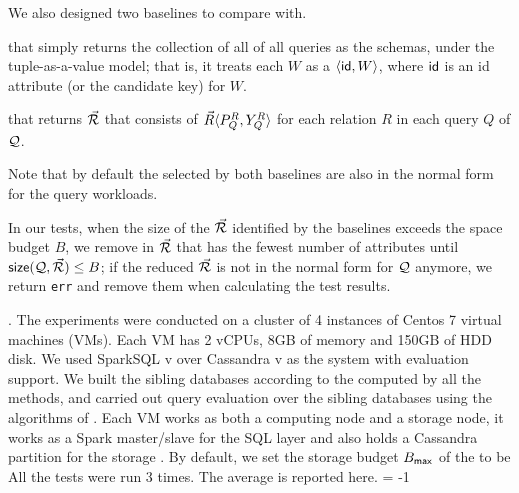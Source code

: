 \vspace{0.7ex}
We also designed two baselines to compare with.

 that simply returns the collection
of all \qcs of all queries as the schemas, under the
tuple-as-a-value model; that is, it treats each \qcs $W$ as a \bs
$\langle \protect\mathsf{id},\allowbreak W\rangle$, where $\protect\mathsf{id}$ is an id attribute (or
the candidate key) for $W$.

 that returns $\vec{{\mathcal R}}$ that consists
of \bss $\vec{R}\langle P_{Q}^{R},\allowbreak Y_{Q}^{R}\rangle$ for each relation $R$
in each query $Q$ of $\mathcal Q$.

\vspace{0.4ex}
Note that by default the \bdss selected by both baselines
are also in the normal form for the query workloads.

In our tests, when the size of the
\bdss $\vec{{\mathcal R}}$ identified by the baselines %
exceeds the space budget $B$, we remove \bss in $\vec{{\mathcal R}}$ that has
the fewest number of attributes until ${\mathsf{size}}(\mathcal Q, \vec{{\mathcal R}})\leq B$;
if the reduced $\vec{{\mathcal R}}$ is not in the normal form for $\mathcal Q$
anymore, we return \texttt{err} and remove them when calculating the
test results.


.
The experiments were conducted on a cluster of 4 instances of
Centos 7 virtual machines (VMs). Each VM has 2 vCPUs, 8GB of
memory and 150GB of HDD disk. 
We used SparkSQL v over Cassandra v as the \kv
system with \SQL evaluation support. %
We built the sibling databases according to the computed \bdss by
all the methods, and carried out query evaluation over the
sibling \baav databases using the algorithms of \cite{VLDB19}.
Each VM works as both a computing node and a storage node, \ie it works
as a Spark master/slave for the SQL layer  and also holds a
Cassandra partition for the storage .
By default, we set the storage budget $B_{\protect\mathsf{max}}$ of the
\bdss to be 
All the tests were run 3 times. The average is reported here.
\looseness = -1

